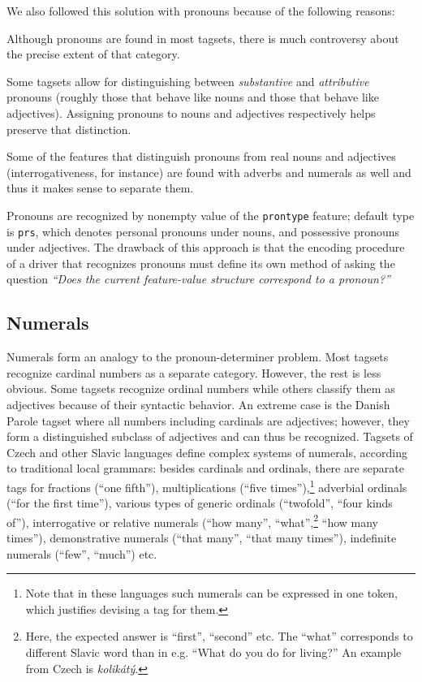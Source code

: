 \documentclass[11pt]{article}
\begin{document}
We also followed this solution with pronouns because of the following reasons:
\begin{compactitem}
\item Although pronouns are found in most tagsets, there is much controversy about the precise extent of that category.
\item Some tagsets allow for distinguishing between \textit{substantive} and \textit{attributive} pronouns (roughly those that behave like nouns and those that behave like adjectives). Assigning pronouns to nouns and adjectives respectively helps preserve that distinction.
\item Some of the features that distinguish pronouns from real nouns and adjectives (interrogativeness, for instance) are found with adverbs and numerals as well and thus it makes sense to separate them.
\end{compactitem}

Pronouns are recognized by nonempty value of the \texttt{prontype} feature; default type is \texttt{prs}, which denotes personal pronouns under nouns, and possessive pronouns under adjectives. The drawback of this approach is that the encoding procedure of a driver that recognizes pronouns must define its own method of asking the question \textit{``Does the current feature-value structure correspond to a pronoun?''}

\subsection{Numerals}
\label{sec:numerals}

Numerals form an analogy to the pronoun-determiner problem. Most tagsets recognize cardinal numbers as a separate category. However, the rest is less obvious. Some tagsets recognize ordinal numbers while others classify them as adjectives because of their syntactic behavior. An extreme case is the Danish Parole tagset where all numbers including cardinals are adjectives; however, they form a distinguished subclass of adjectives and can thus be recognized. Tagsets of Czech and other Slavic languages define complex systems of numerals, according to traditional local grammars: besides cardinals and ordinals, there are separate tags for fractions (``one fifth''), multiplications (``five times''),\footnote{Note that in these languages such numerals can be expressed in one token, which justifies devising a tag for them.} adverbial ordinals (``for the first time''), various types of generic ordinals (``twofold'', ``four kinds of''), interrogative or relative numerals (``how many'', ``what'',\footnote{Here, the expected answer is ``first'', ``second'' etc. The ``what'' corresponds to different Slavic word than in e.g. ``What do you do for living?'' An example from Czech is \textit{kolikátý}.} ``how many times''), demonstrative numerals (``that many'', ``that many times''), indefinite numerals (``few'', ``much'') etc.
\end{document}
